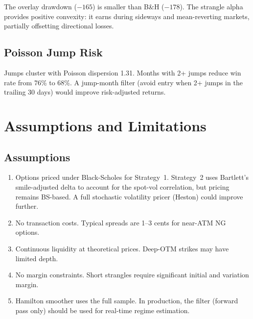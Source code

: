 \documentclass[11pt,a4paper]{article}
\begin{document}
The overlay drawdown ($-165$) is smaller than B\&H ($-178$). The strangle alpha provides positive convexity: it earns during sideways and mean-reverting markets, partially offsetting directional losses.

\subsection{Poisson Jump Risk}

Jumps cluster with Poisson dispersion 1.31. Months with 2+ jumps reduce win rate from 76\% to 68\%. A jump-month filter (avoid entry when 2+ jumps in the trailing 30 days) would improve risk-adjusted returns.


\section{Assumptions and Limitations}

\subsection{Assumptions}
\begin{enumerate}[nosep]
\item Options priced under Black-Scholes for Strategy~1. Strategy~2 uses Bartlett's smile-adjusted delta to account for the spot-vol correlation, but pricing remains BS-based. A full stochastic volatility pricer (Heston) could improve further.
\item No transaction costs. Typical spreads are 1--3 cents for near-ATM NG options.
\item Continuous liquidity at theoretical prices. Deep-OTM strikes may have limited depth.
\item No margin constraints. Short strangles require significant initial and variation margin.
\item Hamilton smoother uses the full sample. In production, the filter (forward pass only) should be used for real-time regime estimation.
\end{enumerate}
\end{document}
